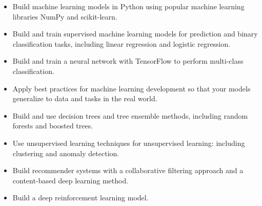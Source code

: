 \begin{itemize}
    \item Build machine learning models in Python using popular machine learning libraries NumPy and scikit-learn.
    \item Build and train supervised machine learning models for prediction and binary classification tasks, including linear regression and logistic regression.
    \item Build and train a neural network with TensorFlow to perform multi-class classification.
    \item Apply best practices for machine learning development so that your models generalize to data and tasks in the real world.
    \item Build and use decision trees and tree ensemble methods, including random forests and boosted trees.
    \item Use unsupervised learning techniques for unsupervised learning: including clustering and anomaly detection.
    \item Build recommender systems with a collaborative filtering approach and a content-based deep learning method.
    \item Build a deep reinforcement learning model.
\end{itemize}